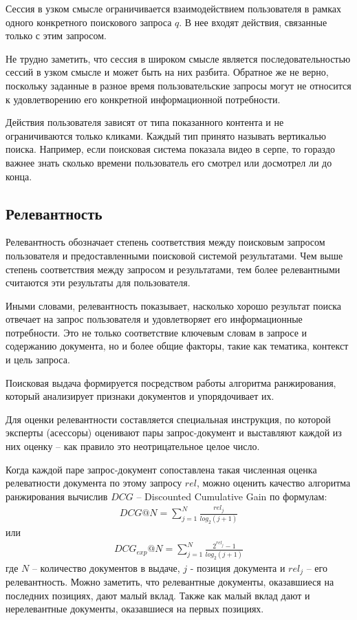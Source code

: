\documentclass[diploma]{nanolab2015}
\begin{document}
Сессия в узком смысле ограничивается взаимодействием пользователя в рамках одного конкретного поискового запроса $q$. В нее входят действия, связанные только с этим запросом.

Не трудно заметить, что сессия в широком смысле является последовательностью сессий в узком смысле и может быть на них разбита. Обратное же не верно, поскольку заданные в разное время пользовательские запросы могут не относится к удовлетворению его конкретной информационной потребности.

Действия пользователя зависят от типа показанного контента и не ограничиваются только кликами. Каждый тип принято называть вертикалью поиска. Например, если поисковая система показала видео в серпе, то гораздо важнее знать сколько времени пользователь его смотрел или досмотрел ли до конца.

\subsection{Релевантность}
Релевантность обозначает степень соответствия между поисковым запросом пользователя и предоставленными поисковой системой результатами. Чем выше степень соответствия между запросом и результатами, тем более релевантными считаются эти результаты для пользователя.

Иными словами, релевантность показывает, насколько хорошо результат поиска отвечает на запрос пользователя и удовлетворяет его информационные потребности. Это не только соответствие ключевым словам в запросе и содержанию документа, но и более общие факторы, такие как тематика, контекст и цель запроса.

Поисковая выдача формируется посредством работы алгоритма ранжирования, который анализирует признаки документов и упорядочивает их.

Для оценки релевантности составляется специальная инструкция, по которой эксперты (асессоры) оценивают пары запрос-документ и выставляют каждой из них оценку -- как правило это неотрицательное целое число.

Когда каждой паре запрос-документ сопоставлена такая численная оценка релеватности документа по этому запросу $rel$, можно оценить качество алгоритма ранжирования вычислив $DCG$ -- Discounted Cumulative Gain по формулам:
\begin{align}
    DCG@N = \sum_{j=1}^{N} \frac{rel_j}{log_2(j+1)} \label{dcg}
\end{align}
или
\begin{align}
    DCG_{exp}@N = \sum_{j=1}^{N} \frac{2^{rel_j} - 1}{log_2(j+1)} \label{dcg:exp}
\end{align}
где $N$ -- количество документов в выдаче, $j$ - позиция документа и $rel_j$ -- его релевантность. Можно заметить, что релевантные документы, оказавшиеся на последних позициях, дают малый вклад. Также как малый вклад дают и нерелевантные документы, оказавшиеся на первых позициях.
\end{document}
